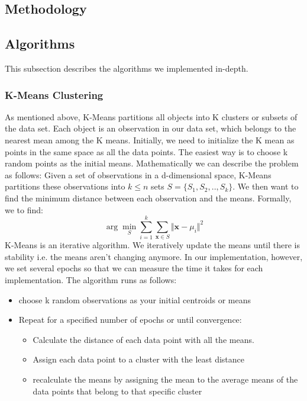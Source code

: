 \begin{multicols*}{2}
    \section{Methodology}
    \subsection{Algorithms}
    This subsection describes the algorithms we implemented in-depth. 
    \subsubsection{K-Means Clustering}
    As mentioned above, K-Means partitions all objects into K clusters or subsets of the data set. Each object is an observation in our data set, which belongs to the nearest mean among the K means. Initially, we need to initialize the K mean as points in the same space as all the data points. The easiest way is to choose k random points as the initial means. Mathematically we can describe the problem as follows:
    Given a set of observations in a d-dimensional space,  K-Means partitions these observations into $k\leq n$ sets $S = \{S_1, S_2 , .. ,S_k\}$. We then want to find the minimum distance between each observation and the means. Formally, we to find:
    \begin{equation}
        \arg \min_S\sum_{i = 1}^{k}\sum_{\mathbf{x}\in S} \Vert \mathbf{x} - \mu_i \Vert^2   
    \end{equation}  
    K-Means is an iterative algorithm. We iteratively update the means until there is stability i.e. the means aren't changing anymore. In our implementation, however, we set several epochs so that we can measure the time it takes for each implementation. 
    The algorithm runs as follows:
    \begin{itemize}
        \item choose k random observations as your initial centroids or means
        \item Repeat for a specified number of epochs or until convergence:
        \begin{itemize}
            \item Calculate the distance of each data point with all the means.
            \item Assign each data point to a cluster with the least distance
            \item recalculate the means by assigning the mean to the average means of the data points that belong to that specific cluster
        \end{itemize}
    \end{itemize}


\end{multicols*}
